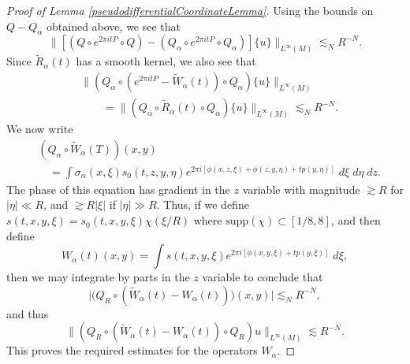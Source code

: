 \begin{proof} [Proof of Lemma \ref{pseudodifferentialCoordinateLemma}]
    Using the bounds on $Q - Q_\alpha$ obtained above, we see that
    \begin{equation} \big\| [(Q \circ e^{2 \pi i t P} \circ Q) - (Q_\alpha \circ e^{2 \pi i t P} \circ Q_\alpha)] \{ u \} \big\|_{L^\infty(M)} \lesssim_N R^{-N}. \end{equation}
    Since $\tilde{R}_\alpha(t)$ has a smooth kernel, we also see that
    \begin{equation}
    \begin{split}
        &\big\| (Q_\alpha \circ (e^{2 \pi i t P} - \tilde{W}_\alpha(t)) \circ Q_\alpha) \{ u \} \big\|_{L^\infty(M)}\\
        &\quad\quad = \big\| (Q_\alpha \circ \tilde{R}_\alpha(t) \circ Q_\alpha) \{ u \} \big\|_{L^\infty(M)} \lesssim_N R^{-N}.
    \end{split}
    \end{equation}
    We now write
    \begin{equation}
    \begin{split}
        &(Q_\alpha \circ \tilde{W}_\alpha(T))(x,y)\\
        &\quad = \int \sigma_\alpha(x,\xi) s_0(t,z,y,\eta) e^{2 \pi i [\phi(x,z,\xi) + \phi(z,y,\eta) + t p(y,\eta) ]}\; d\xi\; d\eta\; dz.
    \end{split}
    \end{equation}
    The phase of this equation has gradient in the $z$ variable with magnitude $\gtrsim R$ for $|\eta| \ll R$, and $\gtrsim R |\xi|$ if $|\eta| \gg R$. Thus, if we define $s(t,x,y,\xi) = s_0(t,x,y,\xi) \chi(\xi / R)$ where $\text{supp}(\chi) \subset [1/8,8]$, and then define
    \begin{equation} W_\alpha(t)(x,y) = \int s(t,x,y,\xi) e^{2 \pi i [ \phi(x,y,\xi) + t p(y,\xi) ]}\; d\xi, \end{equation}
    then we may integrate by parts in the $z$ variable to conclude that
    \begin{equation} \Big|\big(Q_R \circ (\tilde{W}_\alpha(t) - W_\alpha(t)) \big)(x,y) \Big| \lesssim_N R^{-N}, \end{equation}
    and thus
    \begin{equation} \| (Q_R \circ (\tilde{W}_\alpha(t) - W_\alpha(t)) \circ Q_R) u \|_{L^\infty(M)} \lesssim R^{-N}. \end{equation}
    This proves the required estimates for the operators $W_\alpha$.
\end{proof}

